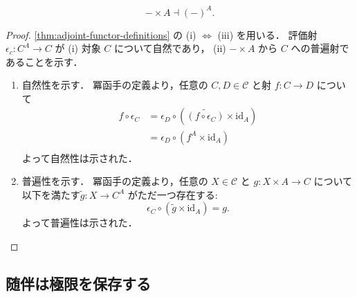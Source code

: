 \documentclass[titlepage]{ltjsreport}
\newcommand{\cat}[1]{\mathscr{#1}}
\newcommand{\objs}[1]{#1}
\newcommand{\id}[1]{\mathrm{id}_{#1}}
\begin{document}
\begin{theorem}[積函手と冪函手]
  \begin{equation}
    -\times A\dashv{(-)}^A.
  \end{equation}
\end{theorem}

\begin{proof}
  \cref{thm:adjoint-functor-definitions} の (i) $\Leftrightarrow$ (iii) を用いる．
  評価射 $\epsilon_c:{C}^A\to C$ が
  (i) 対象 $C$ について自然であり，
  (ii) $-\times A$ から $C$ への普遍射であることを示す．

  \begin{enumerate}[label=(\roman*)] %
    \item 自然性を示す．
          冪函手の定義より，任意の $C,D\in\objs{\cat{C}}$ と射 $f:C\to D$ について
          \begin{align*}
            f\circ\epsilon_C
             & =\epsilon_D\circ(\widetilde{(f\circ\epsilon_C)}\times\id{A}) \\
             & =\epsilon_D\circ(f^A\times\id{A})                            \\
          \end{align*}
          よって自然性は示された．
    \item 普遍性を示す．
          冪函手の定義より，任意の $X\in\objs{\cat{C}}$ と $g:X\times A\to C$
          について以下を満たす$\tilde{g}:X\to C^A$ がただ一つ存在する:
          \begin{equation*}
            \epsilon_C\circ(\tilde{g}\times\id{A})=g.
          \end{equation*}
          よって普遍性は示された．
  \end{enumerate}
\end{proof}

\subsection{随伴は極限を保存する}
\end{document}
